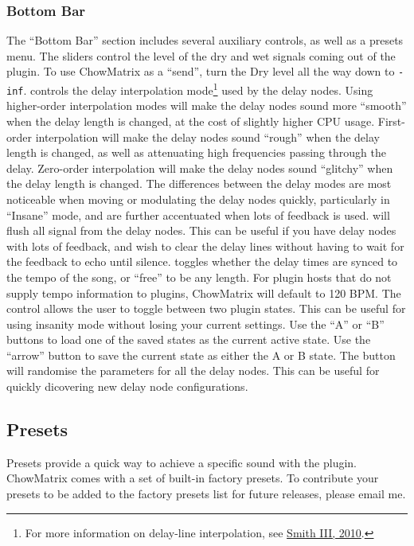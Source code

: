 \documentclass[landscape,twocolumn,a5paper]{manual}
\begin{document}
\subsubsection{Bottom Bar}
The ``Bottom Bar'' section includes several auxiliary controls,
as well as a presets menu.
\newpar
The  sliders control the level of the dry
and wet signals coming out of the plugin. To use ChowMatrix as
a ``send'', turn the Dry level all the way down to \texttt{-inf}.
\newpar
\hypertarget{goto:interp-mode}{} controls
the delay interpolation mode\footnote{For more information on
delay-line interpolation, see \href{https://ccrma.stanford.edu/~jos/pasp/Delay_Line_Signal_Interpolation.html}{Smith III, 2010}.}
used by the delay nodes. Using higher-order interpolation modes
will make the delay nodes sound more ``smooth'' when the delay
length is changed, at the cost of slightly higher CPU usage.
First-order interpolation will make the delay nodes sound ``rough''
when the delay length is changed, as well as attenuating high
frequencies passing through the delay. Zero-order interpolation
will make the delay nodes sound  ``glitchy'' when the delay length
is changed. The differences between the delay modes are most noticeable
when moving or modulating the delay nodes quickly, particularly
in ``Insane'' mode, and are further accentuated when lots of
feedback is used.
\newpar
{} will flush all signal from the delay nodes.
This can be useful if you have delay nodes with lots of feedback,
and wish to clear the delay lines without having to wait for
the feedback to echo until silence.
\newpar
{} toggles whether the delay times are
synced to the tempo of the song, or ``free'' to be any length.
For plugin hosts that do not supply tempo information to plugins,
ChowMatrix will default to 120 BPM.
\newpar
The  control allows the user to toggle
between two plugin states. This can be useful for using
insanity mode without losing your current settings. Use
the ``A'' or ``B'' buttons to load one of the saved states
as the current active state. Use the ``arrow'' button to
save the current state as either the A or B state.
\newpar
The  button will randomise the parameters
for all the delay nodes. This can be useful for quickly
dicovering new delay node configurations.

\subsection{Presets}
Presets provide a quick way to achieve a specific sound
with the plugin. ChowMatrix comes with a set of built-in
factory presets. To contribute your presets to be added
to the factory presets list for future releases, please
email me.
\end{document}
